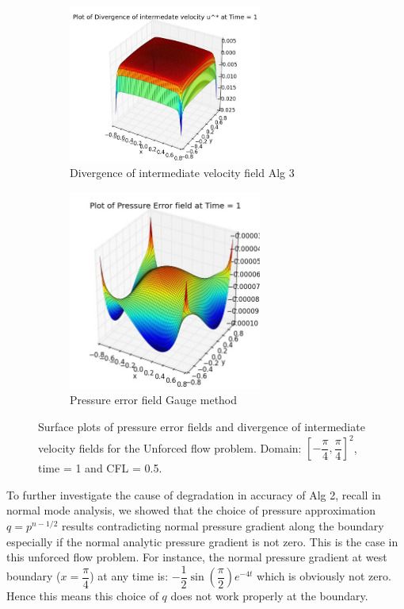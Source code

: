 \begin{figure}[H]
	\quad
	\begin{subfigure}[t]{2.5in}
		\centering
		\includegraphics[width=2.5in]{figures/Pm2_unf1_np_div_uvstar_t_1_grid_60.jpg}
		\caption{Divergence of intermediate velocity field Alg 3}\label{fig:6.15d}
	\end{subfigure}
	\quad
	\begin{subfigure}[t]{2.5in}
		\centering
		\includegraphics[width=2.5in]{figures/Gauge_unf1_P_error_t_1_grid_60.jpg}
		\caption{Pressure error field Gauge method }\label{fig:6.15e}
	\end{subfigure}
	\caption{Surface plots of pressure error fields and divergence of intermediate velocity fields for the Unforced flow problem. Domain: $[-\dfrac{\pi}{4}, \dfrac{\pi}{4}]^2$, time = 1 and CFL = 0.5.}\label{fig:6.15}
\end{figure}

To further investigate the cause of degradation in accuracy of Alg 2, recall in normal mode analysis, we showed that the choice of pressure approximation $q = p^{n-1/2}$ results contradicting normal pressure gradient along the boundary especially if the normal analytic pressure gradient is not zero. This is the case in this unforced flow problem. For instance, the normal pressure gradient at west boundary ($x=\dfrac{\pi}{4}$) at any time is: $-\dfrac{1}{2}\sin(\dfrac{\pi}{2})e^{-4t}$ which is obviously not zero. Hence this means this choice of $q$ does not work properly at the boundary.\\

